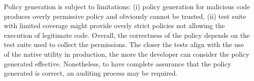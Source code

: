 \vspace{2 mm}
\noindent Policy generation is subject to limitations: (i) policy
generation for malicious code 
produces overly permissive policy and obviously cannot be trusted,
(ii) test suite with limited coverage might provide overly strict
policies not allowing the execution of legitimate code.
Overall, the correctness of the policy depends on the test suite used
to collect the permissions. The closer the tests align with the use of
the native utility in production, the more the developer can consider
the policy generated effective. Nonetheless, to have complete
assurance that the policy generated is correct, an auditing process
may be required.

